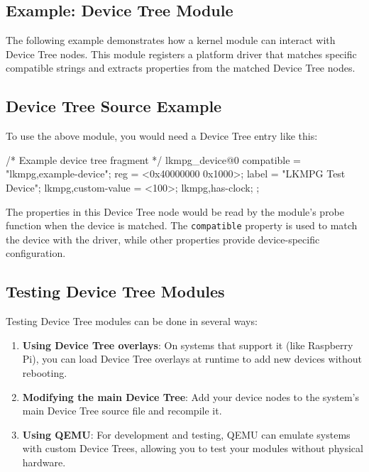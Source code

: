 \documentclass[10pt, oneside]{book}
\begin{document}
\subsection{Example: Device Tree Module}
\label{sec:dt_example}
The following example demonstrates how a kernel module can interact with Device Tree nodes.
This module registers a platform driver that matches specific compatible strings and extracts properties from the matched Device Tree nodes.


\subsection{Device Tree Source Example}
\label{sec:dt_source}
To use the above module, you would need a Device Tree entry like this:

\begin{code}
/* Example device tree fragment */
lkmpg_device@0 {
    compatible = "lkmpg,example-device";
    reg = <0x40000000 0x1000>;
    label = "LKMPG Test Device";
    lkmpg,custom-value = <100>;
    lkmpg,has-clock;
};
\end{code}

The properties in this Device Tree node would be read by the module's probe function when the device is matched.
The \verb|compatible| property is used to match the device with the driver, while other properties provide device-specific configuration.

\subsection{Testing Device Tree Modules}
\label{sec:dt_testing}
Testing Device Tree modules can be done in several ways:

\begin{enumerate}
  \item \textbf{Using Device Tree overlays}: On systems that support it (like Raspberry Pi), you can load Device Tree overlays at runtime to add new devices without rebooting.

  \item \textbf{Modifying the main Device Tree}: Add your device nodes to the system's main Device Tree source file and recompile it.

  \item \textbf{Using QEMU}: For development and testing, QEMU can emulate systems with custom Device Trees, allowing you to test your modules without physical hardware.
\end{enumerate}
\end{document}
